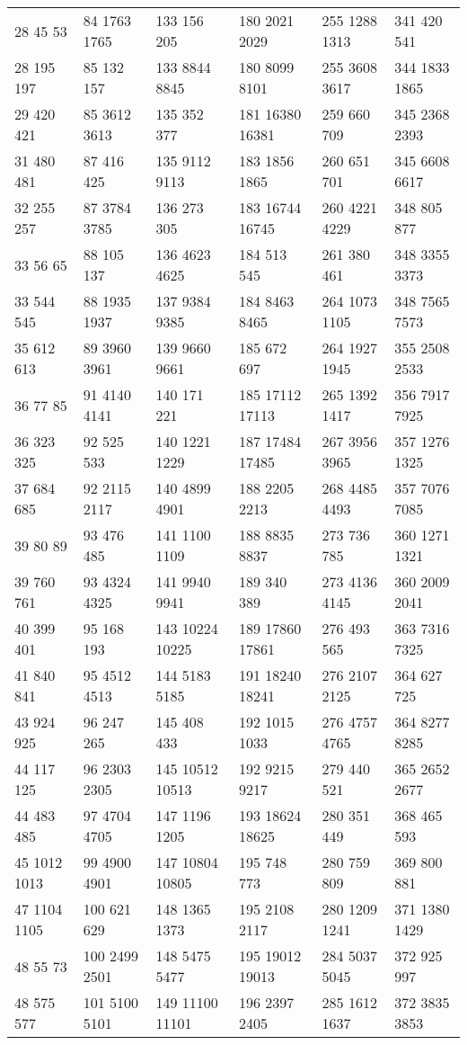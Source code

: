 \begin{center}
\begin{longtable}[c]{llllll}
28 45 53&84 1763 1765&133 156 205&180 2021 2029&255 1288 1313&341 420 541\\
28 195 197&85 132 157&133 8844 8845&180 8099 8101&255 3608 3617&344 1833 1865\\
29 420 421&85 3612 3613&135 352 377&181 16380 16381&259 660 709&345 2368 2393\\
31 480 481&87 416 425&135 9112 9113&183 1856 1865&260 651 701&345 6608 6617\\
32 255 257&87 3784 3785&136 273 305&183 16744 16745&260 4221 4229&348 805 877\\
33 56 65&88 105 137&136 4623 4625&184 513 545&261 380 461&348 3355 3373\\
33 544 545&88 1935 1937&137 9384 9385&184 8463 8465&264 1073 1105&348 7565 7573\\
35 612 613&89 3960 3961&139 9660 9661&185 672 697&264 1927 1945&355 2508 2533\\
36 77 85&91 4140 4141&140 171 221&185 17112 17113&265 1392 1417&356 7917 7925\\
36 323 325&92 525 533&140 1221 1229&187 17484 17485&267 3956 3965&357 1276 1325\\
37 684 685&92 2115 2117&140 4899 4901&188 2205 2213&268 4485 4493&357 7076 7085\\
39 80 89&93 476 485&141 1100 1109&188 8835 8837&273 736 785&360 1271 1321\\
39 760 761&93 4324 4325&141 9940 9941&189 340 389&273 4136 4145&360 2009 2041\\
40 399 401&95 168 193&143 10224 10225&189 17860 17861&276 493 565&363 7316 7325\\
41 840 841&95 4512 4513&144 5183 5185&191 18240 18241&276 2107 2125&364 627 725\\
43 924 925&96 247 265&145 408 433&192 1015 1033&276 4757 4765&364 8277 8285\\
44 117 125&96 2303 2305&145 10512 10513&192 9215 9217&279 440 521&365 2652 2677\\
44 483 485&97 4704 4705&147 1196 1205&193 18624 18625&280 351 449&368 465 593\\
45 1012 1013&99 4900 4901&147 10804 10805&195 748 773&280 759 809&369 800 881\\
47 1104 1105&100 621 629&148 1365 1373&195 2108 2117&280 1209 1241&371 1380 1429\\
48 55 73&100 2499 2501&148 5475 5477&195 19012 19013&284 5037 5045&372 925 997\\
48 575 577&101 5100 5101&149 11100 11101&196 2397 2405&285 1612 1637&372 3835 3853\\

\end{longtable}
\end{center}
